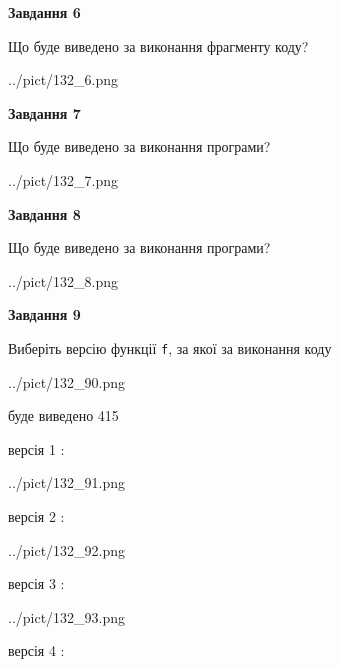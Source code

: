 \documentclass[12pt, ukrainian]{article}
\def\code#1{\Verb!#1!}
\begin{document}
{\begin {large}
{\begin {center}\textbf{Завдання 6}\end {center}}

Що буде виведено за виконання фрагменту коду?\par
\begin{center}
	{../pict/132_6.png}
\end{center}
\newpage

{\begin {center}\textbf{Завдання 7}\end {center}}

Що буде виведено за виконання програми?\par
\begin{center}
	{../pict/132_7.png}
\end{center}
\newpage

{\begin {center}\textbf{Завдання 8}\end {center}}

Що буде виведено за виконання програми?\par
\begin{center}
	{../pict/132_8.png}
\end{center}
\newpage

{\begin {center}\textbf{Завдання 9}\end {center}}

Виберіть версію функції \code{f}, за якої за виконання коду
\begin{center}
	{../pict/132_90.png}
\end{center}
буде виведено 415

\vspace{5mm}
версія 1 :

\begin{center}
	{../pict/132_91.png}
\end{center}
версія 2 :

\begin{center}
	{../pict/132_92.png}
\end{center}
версія 3 :

\begin{center}
	{../pict/132_93.png}
\end{center}
версія 4 :


\end{large}}
\end{document}
